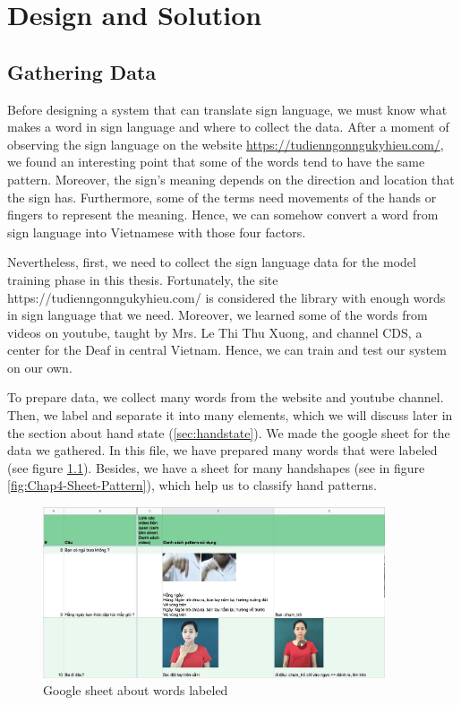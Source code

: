 \chapter{Design and Solution}
\section{Gathering Data}



Before designing a system that can translate sign language, we must know what makes a word in sign language and where to collect the data. After a moment of observing the sign language on the website \url{https://tudienngonngukyhieu.com/}, we found an interesting point that some of the words tend to have the same pattern. Moreover, the sign's meaning depends on the direction and location that the sign has. Furthermore, some of the terms need movements of the hands or fingers to represent the meaning. Hence, we can somehow convert a word from sign language into Vietnamese with those four factors.

Nevertheless, first, we need to collect the sign language data for the model training phase in this thesis. Fortunately, the site https://tudienngonngukyhieu.com/ is considered the library with enough words in sign language that we need. Moreover, we learned some of the words from videos on youtube, taught by Mrs. Le Thi Thu Xuong, and channel CDS, a center for the Deaf in central Vietnam. Hence, we can train and test our system on our own.

To prepare data, we collect many words from the website and youtube channel. Then, we label and separate it into many elements, which we will discuss later in the section about hand state (\ref{sec:handstate}). We made the google sheet for the data we gathered. In this file, we have prepared many words that were labeled (see figure \ref{fig:Chap4-Label-Word}). Besides, we have a sheet for many handshapes (see in figure \ref{fig:Chap4-Sheet-Pattern}), which help us to classify hand patterns.


\begin{figure}[H]
	\centering
	\includegraphics[width=0.9\textwidth]{img/Chap4/Label-Word.jpg}
	\caption{Google sheet about words labeled}
	\label{fig:Chap4-Label-Word}
\end{figure}

